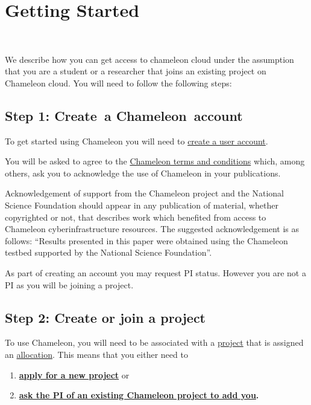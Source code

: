 
\section{Getting Started}
\label{C:cc-start}

\FILENAME\

We describe how you can get access to chameleon cloud under the
assumption that you are a student or a researcher that joins an
existing project on Chameleon cloud. You will need to follow the
following steps:

\subsection{Step 1: Create~a Chameleon~account}

To get started using Chameleon you will need to
\href{https://www.chameleoncloud.org/register}{create a user account}.

You will be asked to agree to the
\href{https://www.chameleoncloud.org/terms/view/chameleon-user-terms/}{Chameleon
  terms and conditions} which, among others, ask you to acknowledge
the use of Chameleon in your publications. 

Acknowledgement of support from the Chameleon project and the
National Science Foundation should appear in any publication of
material, whether copyrighted or not, that describes work which
benefited from access to Chameleon cyberinfrastructure resources. The
suggested acknowledgement is as follows: ``Results presented in this
paper were obtained using the Chameleon testbed supported by the
National Science Foundation''.

\begin{IU}
  As part of creating an account you may request PI status. However
  you are not a PI as you will be joining a project.
\end{IU}

\subsection{Step 2: Create or join a project}

To use Chameleon, you will need to be associated with a
\href{https://www.chameleoncloud.org/docs/user-faq/\#toc-how-do-i-apply-for-a-chameleon-project-}{project}
that is assigned an
\href{https://www.chameleoncloud.org/docs/user-faq/\#toc-what-are-the-project-allocation-sizes-and-limits-}{allocation}.
This means that you either need to

\begin{enumerate}

\item \textbf{\href{https://www.chameleoncloud.org/user/projects/new/}{apply
for a new project}} or 

\item
\textbf{\href{https://www.chameleoncloud.org/docs/user-faq/\#toc-my-pi-professor-colleague-already-has-a-chameleon-project-how-do-i-get-added-as-a-user-on-the-project-}{ask
the PI of an existing Chameleon project to add you}.}

\end{enumerate}


